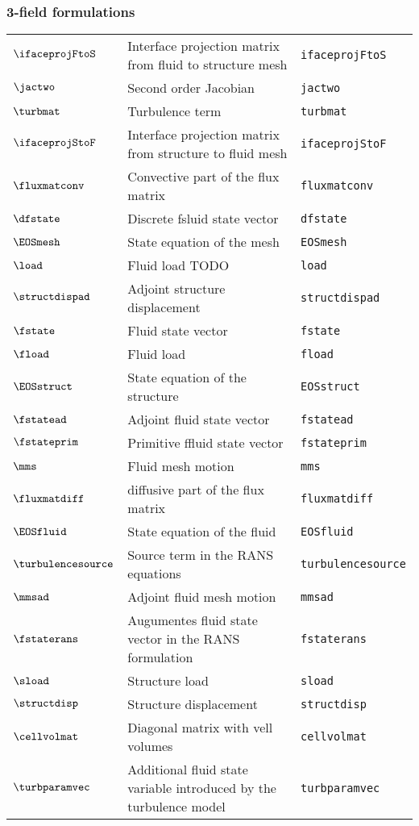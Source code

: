 \subsubsection*{3-field formulations}
\begin{tabular}{l l l}
$\ifaceprojFtoS$ & Interface projection matrix from fluid to structure mesh& \texttt{ifaceprojFtoS}\\
$\jactwo$ & Second order Jacobian& \texttt{jactwo}\\
$\turbmat$ & Turbulence term& \texttt{turbmat}\\
$\ifaceprojStoF$ & Interface projection matrix from structure to fluid mesh& \texttt{ifaceprojStoF}\\
$\fluxmatconv$ & Convective part of the flux matrix& \texttt{fluxmatconv}\\
$\dfstate$ & Discrete fsluid state vector& \texttt{dfstate}\\
$\EOSmesh$ & State equation of the mesh& \texttt{EOSmesh}\\
$\load$ & Fluid load TODO& \texttt{load}\\
$\structdispad$ & Adjoint structure displacement& \texttt{structdispad}\\
$\fstate$ & Fluid state vector& \texttt{fstate}\\
$\fload$ & Fluid load& \texttt{fload}\\
$\EOSstruct$ & State equation of the structure& \texttt{EOSstruct}\\
$\fstatead$ & Adjoint fluid state vector& \texttt{fstatead}\\
$\fstateprim$ & Primitive ffluid state vector& \texttt{fstateprim}\\
$\mms$ & Fluid mesh motion& \texttt{mms}\\
$\fluxmatdiff$ & diffusive part of the flux matrix& \texttt{fluxmatdiff}\\
$\EOSfluid$ & State equation of the fluid& \texttt{EOSfluid}\\
$\turbulencesource$ & Source term in the \ac{RANS} equations& \texttt{turbulencesource}\\
$\mmsad$ & Adjoint fluid mesh motion& \texttt{mmsad}\\
$\fstaterans$ & Augumentes fluid state vector in the \ac{RANS} formulation& \texttt{fstaterans}\\
$\sload$ & Structure load& \texttt{sload}\\
$\structdisp$ & Structure displacement& \texttt{structdisp}\\
$\cellvolmat$ & Diagonal matrix with vell volumes& \texttt{cellvolmat}\\
$\turbparamvec$ & Additional fluid state variable introduced by the turbulence model& \texttt{turbparamvec}\\
\end{tabular}

